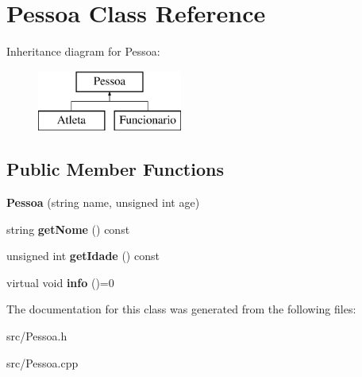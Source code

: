 \hypertarget{class_pessoa}{}\section{Pessoa Class Reference}
\label{class_pessoa}
Inheritance diagram for Pessoa\+:\begin{figure}[H]
\begin{center}
\leavevmode
\includegraphics[height=2.000000cm]{class_pessoa}
\end{center}
\end{figure}
\subsection*{Public Member Functions}
\begin{DoxyCompactItemize}
\item 
\hypertarget{class_pessoa_a0d11e4a70a79133099518b53f93b05cd}{}{\bfseries Pessoa} (string name, unsigned int age)\label{class_pessoa_a0d11e4a70a79133099518b53f93b05cd}

\item 
\hypertarget{class_pessoa_a8d4d2f40ba5634f49b0ce181fee7f0a7}{}string {\bfseries get\+Nome} () const \label{class_pessoa_a8d4d2f40ba5634f49b0ce181fee7f0a7}

\item 
\hypertarget{class_pessoa_a68115ff0ae1e9d73a87beb4a89c2cd93}{}unsigned int {\bfseries get\+Idade} () const \label{class_pessoa_a68115ff0ae1e9d73a87beb4a89c2cd93}

\item 
\hypertarget{class_pessoa_a3a0b84de86eb7640915a332be964812f}{}virtual void {\bfseries info} ()=0\label{class_pessoa_a3a0b84de86eb7640915a332be964812f}

\end{DoxyCompactItemize}


The documentation for this class was generated from the following files\+:\begin{DoxyCompactItemize}
\item 
src/Pessoa.\+h\item 
src/Pessoa.\+cpp\end{DoxyCompactItemize}
